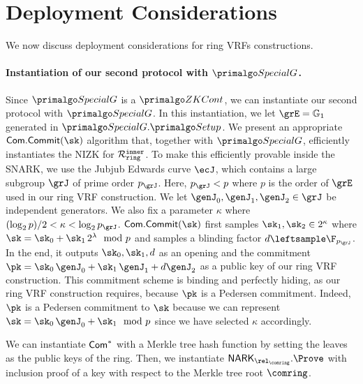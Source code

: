 
\section{Deployment Considerations}\label{sec:deployment}

We now discuss deployment considerations for ring VRFs constructions.

\paragraph{Instantiation of our second protocol with $ \SpecialG $.} Since $ \SpecialG $ is a $ \ZKCont $, we can instantiate our second protocol with $ \SpecialG$. In this instantiation, we let $ \GG = \grone $ generated in $ \SpecialG.\Setup $.  
We present an appropriate $ \mathsf{Com}.\mathsf{Commit}(\sk) $ algorithm that, together with $ \SpecialG $, efficiently instantiates the NIZK for $ \mathcal{R}_{\mathtt{ring}}^{\mathtt{inner}} $. To make this efficiently provable inside the SNARK,  we use the Jubjub Edwards curve $\ecJ$, which contains a large subgroup $\grJ$ of prime order $p_\grJ$. Here, $p_\grJ < p$ where $ p $ is the order of $\grE$ used in our ring VRF construction. We let $\genJ_0,\genJ_1,\genJ_2 \in \grJ$ be independent generators. We also fix a parameter $ \kappa $ where $(\log_2 p)/2 < \kappa < \log_2 p_\grJ$. $ \mathsf{Com}.\mathsf{Commit}(\sk) $ first samples $\sk_1,\sk_2 \in 2^\kappa$  where $\sk = \sk_0 + \sk_1 \, 2^{\lambda} \mod p$ and samples a blinding factor $d \leftsample \F_{p_\grJ} $. In the end, it outputs $ \sk_0, \sk_1,d $ as an opening and the commitment $\pk=\sk_0\, \genJ_0 + \sk_1\, \genJ_1 + d \genJ_2$ as a public key of our ring VRF construction. This commitment scheme is binding and perfectly hiding, as our ring VRF construction requires, because $ \pk $ is a Pedersen commitment. Indeed, $\pk$ is a Pedersen commitment to $\sk$ because we can represent $ \sk = \sk_0\, \genJ_0 + \sk_1 \mod p$ since we have selected $ \kappa $ accordingly.

We can instantiate $ \mathsf{Com}^*$ with a Merkle tree hash function by setting the leaves as the public keys of the ring. Then, we instantiate $ \NARK_{\relcomring}.\Prove $ with inclusion proof of a key with respect to the Merkle tree root $ \comring $.


